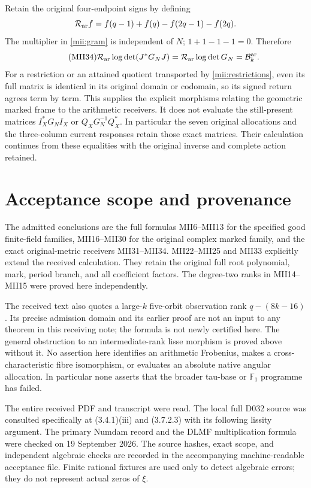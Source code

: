 \documentclass[11pt]{article}
\begin{document}
Retain the original four-endpoint signs by defining
\[
 \mathcal R_{\rm ar}f=f(q-1)+f(q)-f(2q-1)-f(2q).
\]
The multiplier in \eqref{mii:gram} is independent of $N$;
$1+1-1-1=0$. Therefore
\begin{equation}\tag{MII34}\label{mii:return}
 \mathcal R_{\rm ar}\log\det(J^*G_NJ)
    =\mathcal R_{\rm ar}\log\det G_N
    =\mathcal B_k^{\rm ar}.
\end{equation}
For a restriction or an attained quotient transported by
\eqref{mii:restrictions}, even its full matrix is identical in its
original domain or codomain, so its signed return agrees term by
term. This supplies the explicit morphisms relating the geometric
marked frame to the arithmetic receivers. It does not evaluate
the still-present matrices $I_X^*G_NI_X$ or $Q_XG_N^{-1}Q_X^*$.
In particular the seven original allocations and the three-column
current responses retain those exact matrices. Their calculation
continues from these equalities with the original inverse and
complete action retained.

\section{Acceptance scope and provenance}
The admitted conclusions are the full formulas MII6--MII13 for
the specified good finite-field families, MII16--MII30 for the
original complex marked family, and the exact original-metric
receivers MII31--MII34. MII22--MII25 and MII33 explicitly extend
the received calculation. They retain the original full root
polynomial, mark, period branch, and all coefficient factors.
The degree-two ranks in MII14--MII15 were proved here independently.

The received text also quotes a large-$k$ five-orbit observation
rank $q-(8k-16)$. Its precise admission domain and its earlier
proof are not an input to any theorem in this receiving note;
the formula is not newly certified here. The general obstruction
to an intermediate-rank lisse morphism is proved above without it.
No assertion here identifies an arithmetic Frobenius, makes a
cross-characteristic fibre isomorphism, or evaluates an absolute
native angular allocation. In particular none asserts that the
broader tau-base or $\mathbb F_1$ programme has failed.

The entire received PDF and transcript were read. The local full
D032 source was consulted specifically at (3.4.1)(iii) and
(3.7.2.3) with its following lissity argument. The primary Numdam
record and the DLMF multiplication formula were checked on
19 September 2026. The source hashes, exact scope, and independent
algebraic checks are recorded in the accompanying machine-readable
acceptance file. Finite rational fixtures are used only to detect
algebraic errors; they do not represent actual zeros of $\xi$.
\end{document}

